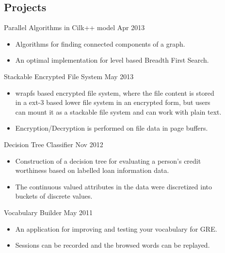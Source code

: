 \documentclass [margin] {res}
\begin{document}
\begin{resume}
\section{Projects} 
		 Parallel  Algorithms in Cilk++ model \hfill   Apr 2013
                 \begin{itemize} \itemsep -2pt
				 \item Algorithms for finding connected components of a graph.
				 \item An optimal  implementation for level based Breadth First Search.
		  \end{itemize}

		Stackable Encrypted File System \hfill   May 2013
                \begin{itemize} \itemsep -2pt
                 \item wrapfs based encrypted file system, where the file content is stored\\
				 in a ext-3 based lower file system in an encrypted form, but users\\
				 can	 mount it as a stackable file system and can work with plain text.
                 \item Encryption/Decryption is performed on file data in page buffers.
		 \end{itemize}

	   Decision Tree Classifier    \hfill         Nov 2012 
                \begin{itemize} \itemsep -2pt
              \item Construction of a decision tree for evaluating a person's credit \\
			  worthiness based on labelled loan information data.
              \item The continuous valued attributes in the data were discretized into\\
			  buckets of discrete values.
		 \end{itemize}
Vocabulary Builder \hfill   May 2011
                \begin{itemize} \itemsep -2pt
                 \item An application for improving and testing your vocabulary for GRE.
                 \item Sessions can be recorded and the browsed words can be replayed.
		 \end{itemize}


\end{resume}
\end{document}
